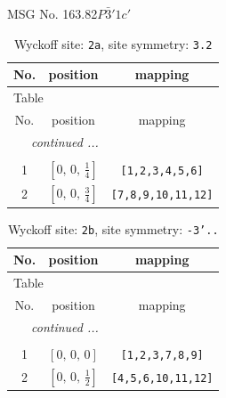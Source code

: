 \documentclass[fleqn,8pt]{jsarticle}
\begin{document}
\setcounter{MaxMatrixCols}{32}

\renewcommand{\tablename}{Table~}
\renewcommand{\figurename}{Figure~}
\begin{center}
\LARGE
MSG No. 163.82\quad$P\bar{3}'1c'$
\end{center}
\renewcommand{\arraystretch}{1.2}
\begin{longtable}{ccc}
\caption{Wyckoff site: {\tt 2a}, site symmetry: {\tt 3.2}}
 \\
 \hline \hline
No. & position & mapping \\ \hline \endfirsthead

\multicolumn{2}{l}{\tablename\ \thetable{}} \\
 \hline \hline
No. & position & mapping \\ \hline \endhead

 \hline \hline
\multicolumn{2}{r}{\footnotesize\it continued ...} \\ \endfoot

 \hline \hline
\multicolumn{2}{r}{} \\ \endlastfoot

1 & $\left[ 0,\, 0,\, \frac{1}{4} \right]$ & {\tt [1,2,3,4,5,6]} \\ \hline
2 & $\left[ 0,\, 0,\, \frac{3}{4} \right]$ & {\tt [7,8,9,10,11,12]} \\
\end{longtable}
\renewcommand{\arraystretch}{1.2}
\begin{longtable}{ccc}
\caption{Wyckoff site: {\tt 2b}, site symmetry: {\tt -3'..}}
 \\
 \hline \hline
No. & position & mapping \\ \hline \endfirsthead

\multicolumn{2}{l}{\tablename\ \thetable{}} \\
 \hline \hline
No. & position & mapping \\ \hline \endhead

 \hline \hline
\multicolumn{2}{r}{\footnotesize\it continued ...} \\ \endfoot

 \hline \hline
\multicolumn{2}{r}{} \\ \endlastfoot

1 & $\left[ 0,\, 0,\, 0 \right]$ & {\tt [1,2,3,7,8,9]} \\ \hline
2 & $\left[ 0,\, 0,\, \frac{1}{2} \right]$ & {\tt [4,5,6,10,11,12]} \\
\end{longtable}
\end{document}
